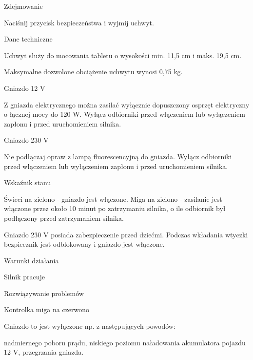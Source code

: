 Zdejmowanie
\begin{itemizeArrow}
	\itemArrow Naciśnij przycisk bezpieczeństwa i wyjmij uchwyt.
\end{itemizeArrow}

Dane techniczne

Uchwyt służy do mocowania tabletu o wysokości min. 11,5 cm i maks. 19,5 cm.

Maksymalne dozwolone obciążenie uchwytu wynosi 0,75 kg.

Gniazdo 12 V

\begin{itemizeTriangle}
	\itemTriangle Z gniazda elektrycznego można zasilać wyłącznie dopuszczony osprzęt elektryczny o łącznej mocy do 120 W.
	\itemTriangle Wyłącz odbiorniki przed włączeniem lub wyłączeniem zapłonu i przed uruchomieniem silnika.
\end{itemizeTriangle}

Gniazdo 230 V


\begin{itemizeTriangle}
	\itemTriangle Nie podłączaj opraw z lampą fluorescencyjną do gniazda.
	\itemTriangle Wyłącz odbiorniki przed włączeniem lub wyłączeniem zapłonu i przed uruchomieniem silnika.
\end{itemizeTriangle}

Wskaźnik stanu

\begin{itemizeTriangle}
	\itemTriangle Świeci na zielono - gniazdo jest włączone.
	\itemTriangle Miga na zielono - zasilanie jest włączone przez około 10 minut po zatrzymaniu silnika, o ile odbiornik był podłączony przed zatrzymaniem silnika.
\end{itemizeTriangle}

Gniazdo 230 V posiada zabezpieczenie przed dziećmi. Podczas wkładania wtyczki bezpiecznik jest odblokowany i gniazdo jest włączone.

Warunki działania
\begin{itemizeTick}
	\itemTick Silnik pracuje
\end{itemizeTick}

Rozwiązywanie problemów

Kontrolka miga na czerwono

Gniazdo to jest wyłączone np. z następujących powodów:
\begin{itemizeTriangle}
	\itemTriangle nadmiernego poboru prądu,
	\itemTriangle niskiego poziomu naładowania akumulatora pojazdu 12 V,
	\itemTriangle przegrzania gniazda.
\end{itemizeTriangle}

